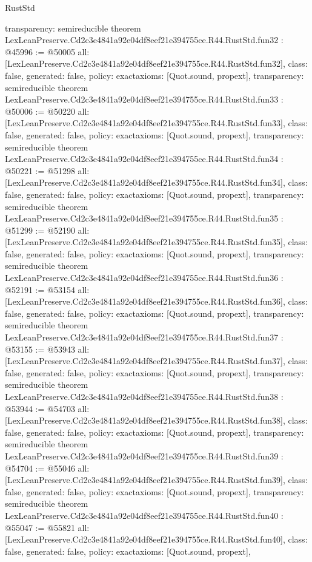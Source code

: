\begin{lexlean}{RustStd}
\begin{coremodule}
{  transparency: semireducible
}
theorem LexLeanPreserve.Cd2c3e4841a92e04df8eef21e394755ce.R44.RustStd.fun32 : @45996 := @50005 {
  all: [LexLeanPreserve.Cd2c3e4841a92e04df8eef21e394755ce.R44.RustStd.fun32],
  class: false,
  generated: false,
  policy: exact{axioms: [Quot.sound, propext]},
  transparency: semireducible
}
theorem LexLeanPreserve.Cd2c3e4841a92e04df8eef21e394755ce.R44.RustStd.fun33 : @50006 := @50220 {
  all: [LexLeanPreserve.Cd2c3e4841a92e04df8eef21e394755ce.R44.RustStd.fun33],
  class: false,
  generated: false,
  policy: exact{axioms: [Quot.sound, propext]},
  transparency: semireducible
}
theorem LexLeanPreserve.Cd2c3e4841a92e04df8eef21e394755ce.R44.RustStd.fun34 : @50221 := @51298 {
  all: [LexLeanPreserve.Cd2c3e4841a92e04df8eef21e394755ce.R44.RustStd.fun34],
  class: false,
  generated: false,
  policy: exact{axioms: [Quot.sound, propext]},
  transparency: semireducible
}
theorem LexLeanPreserve.Cd2c3e4841a92e04df8eef21e394755ce.R44.RustStd.fun35 : @51299 := @52190 {
  all: [LexLeanPreserve.Cd2c3e4841a92e04df8eef21e394755ce.R44.RustStd.fun35],
  class: false,
  generated: false,
  policy: exact{axioms: [Quot.sound, propext]},
  transparency: semireducible
}
theorem LexLeanPreserve.Cd2c3e4841a92e04df8eef21e394755ce.R44.RustStd.fun36 : @52191 := @53154 {
  all: [LexLeanPreserve.Cd2c3e4841a92e04df8eef21e394755ce.R44.RustStd.fun36],
  class: false,
  generated: false,
  policy: exact{axioms: [Quot.sound, propext]},
  transparency: semireducible
}
theorem LexLeanPreserve.Cd2c3e4841a92e04df8eef21e394755ce.R44.RustStd.fun37 : @53155 := @53943 {
  all: [LexLeanPreserve.Cd2c3e4841a92e04df8eef21e394755ce.R44.RustStd.fun37],
  class: false,
  generated: false,
  policy: exact{axioms: [Quot.sound, propext]},
  transparency: semireducible
}
theorem LexLeanPreserve.Cd2c3e4841a92e04df8eef21e394755ce.R44.RustStd.fun38 : @53944 := @54703 {
  all: [LexLeanPreserve.Cd2c3e4841a92e04df8eef21e394755ce.R44.RustStd.fun38],
  class: false,
  generated: false,
  policy: exact{axioms: [Quot.sound, propext]},
  transparency: semireducible
}
theorem LexLeanPreserve.Cd2c3e4841a92e04df8eef21e394755ce.R44.RustStd.fun39 : @54704 := @55046 {
  all: [LexLeanPreserve.Cd2c3e4841a92e04df8eef21e394755ce.R44.RustStd.fun39],
  class: false,
  generated: false,
  policy: exact{axioms: [Quot.sound, propext]},
  transparency: semireducible
}
theorem LexLeanPreserve.Cd2c3e4841a92e04df8eef21e394755ce.R44.RustStd.fun40 : @55047 := @55821 {
  all: [LexLeanPreserve.Cd2c3e4841a92e04df8eef21e394755ce.R44.RustStd.fun40],
  class: false,
  generated: false,
  policy: exact{axioms: [Quot.sound, propext]},
}
\end{coremodule}
\end{lexlean}
